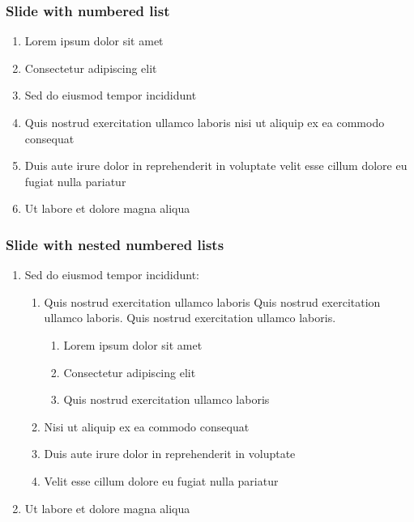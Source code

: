 \begin{frame}
\frametitle{Slide with numbered list}
\begin{enumerate}
\item Lorem ipsum dolor sit amet
\item Consectetur adipiscing elit
\item Sed do eiusmod tempor incididunt
\item Quis nostrud exercitation ullamco laboris nisi ut aliquip ex ea commodo consequat
\item Duis aute irure dolor in reprehenderit in voluptate velit esse cillum dolore eu fugiat nulla pariatur
\item Ut labore et dolore magna aliqua
\end{enumerate}
\end{frame}

\begin{frame}
\frametitle{Slide with nested numbered lists}
\begin{enumerate}
\item Sed do eiusmod tempor incididunt:
\begin{enumerate}
\item Quis nostrud exercitation ullamco laboris Quis nostrud exercitation ullamco laboris. Quis nostrud exercitation ullamco laboris. 
\begin{enumerate}
\item Lorem ipsum dolor sit amet
\item Consectetur adipiscing elit
\item Quis nostrud exercitation ullamco laboris
\end{enumerate}
\item Nisi ut aliquip ex ea commodo consequat
\item Duis aute irure dolor in reprehenderit in voluptate
\item Velit esse cillum dolore eu fugiat nulla pariatur
\end{enumerate}
\item Ut labore et dolore magna aliqua
\end{enumerate}
\end{frame}

